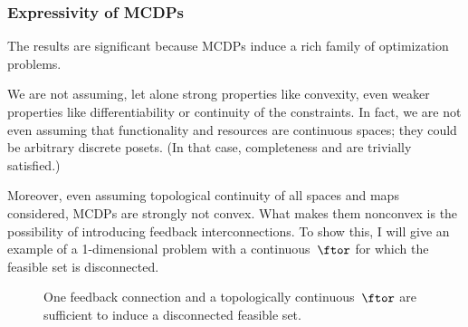 \subsubsection{Expressivity of MCDPs}

The results are significant because MCDPs induce a rich family of
optimization problems. 

We are not assuming, let alone strong properties like convexity, even
weaker properties like differentiability or continuity of the constraints.
In fact, we are not even assuming that functionality and resources
are continuous spaces; they could be arbitrary discrete posets. (In
that case, completeness and \scottcontinuity are trivially satisfied.)

Moreover, even assuming topological continuity of all spaces and maps
considered, MCDPs are strongly not convex. What makes them nonconvex
is the possibility of introducing feedback interconnections. To show
this, I will give an example of a 1-dimensional problem with a continuous~$\ftor$
for which the feasible set is disconnected.

\begin{figure}[h]
\hfill{}\hfill{}\hfill{}

\caption{\label{fig:ceil-1}One feedback connection and a topologically continuous~$\ftor$
are sufficient to induce a disconnected feasible set.}
\end{figure}

\medskip{}

